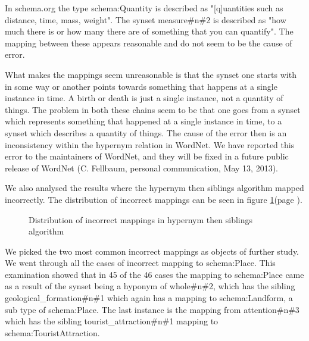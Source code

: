 
In schema.org the type schema:Quantity is described as "[q]uantities such as distance, time, mass, weight".
The synset measure\#n\#2 is described as "how much there is or how many there are of something that you can quantify".
The mapping between these appears reasonable and do not seem to be the cause of error.

What makes the mappings seem unreasonable is that the synset one starts with in some way or another points towards
something that happens at a single instance in time.
A birth or death is just a single instance, not a quantity of things.
The problem in both these chains seem to be that one goes from a synset which represents something that happened at a
single instance in time, to a synset which describes a quantity of things.
The cause of the error then is an inconsistency within the hypernym relation in WordNet.
We have reported this error to the maintainers of WordNet, and they will be fixed in a future public release of WordNet
(C. Fellbaum, personal communication, May 13, 2013).

We also analysed the results where the hypernym then siblings algorithm mapped incorrectly.
The distribution of incorrect mappings can be seen in figure \ref{fig:incorrect}(page \pageref{fig:incorrect}).

\begin{figure}[ht]
	\centering
	\caption{Distribution of incorrect mappings in hypernym then siblings algorithm}
	\label{fig:incorrect}
\end{figure}

We picked the two most common incorrect mappings as objects of further study.
We went through all the cases of incorrect mapping to schema:Place.
This examination showed that in 45 of the 46 cases the mapping to schema:Place came as a result of
the synset being a hyponym of whole\#n\#2, which has the sibling geological\_formation\#n\#1 which again has a mapping to
schema:Landform, a sub type of schema:Place.
The last instance is the mapping from attention\#n\#3 which has the sibling tourist\_attraction\#n\#1 mapping to
schema:TouristAttraction.

